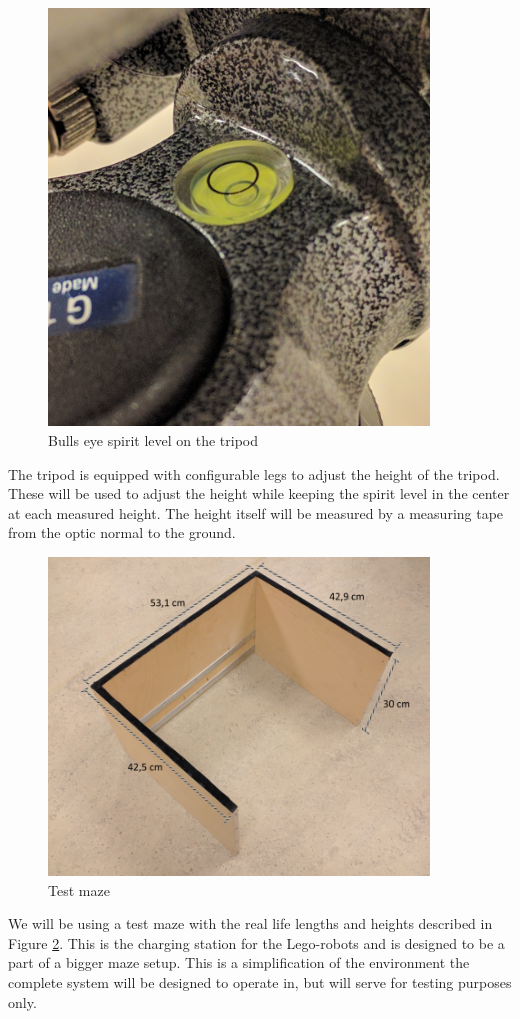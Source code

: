 \begin{figure}[H]
\centering
\includegraphics[width=0.9\textwidth]{fig/vater}
  \caption{Bulls eye spirit level on the tripod}
  \label{fig:vater}
\end{figure}
The tripod is equipped with configurable legs to adjust the height of the tripod. These will be used to adjust the height while keeping the spirit level in the center at each measured height. The height itself will be measured by a measuring tape from the optic normal to the ground. 
\begin{figure}[H]
\centering
\includegraphics[width=0.9\textwidth]{fig/maze}
  \caption{Test maze}
  \label{fig:maze}
\end{figure}
We will be using a test maze with the real life lengths and heights described in Figure \ref{fig:maze}. This is the charging station for the Lego-robots and is designed to be a part of a bigger maze setup. This is a simplification of the environment the complete system will be designed to operate in, but will serve for testing purposes only.\\

